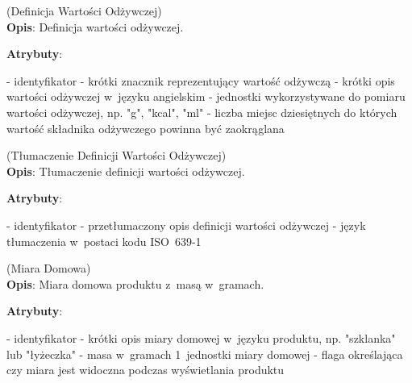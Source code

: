 \begin{enumerate}[label={\textbf{KAT/2/\protect\twodigits{\theenumi}}}, wide, labelwidth=!, labelindent=0pt, labelsep=0pt, series=reqs]
    \label{kat:NutritionDefinition} (Definicja Wartości Odżywczej)\\
    \indent\textbf{Opis}: Definicja wartości odżywczej.
    \par
    \textbf{Atrybuty}:
    \begin{itemize}[series=atr, wide, align=left, leftmargin=190pt]
        \label{kat:NutritionDefinition:id}- identyfikator
        \label{kat:NutritionDefinition:tag}- krótki znacznik reprezentujący wartość odżywczą
        \label{kat:NutritionDefinition:description}- krótki opis wartości odżywczej w~języku angielskim
        \label{kat:NutritionDefinition:units}- jednostki wykorzystywane do pomiaru wartości odżywczej, np. "g", "kcal", "ml"
        \label{kat:NutritionDefinition:decimalPlaces}- liczba miejsc dziesiętnych do których wartość składnika odżywczego powinna być zaokrąglana
    \end{itemize}

    \label{kat:NutritionDefinitionTranslation} (Tłumaczenie Definicji Wartości Odżywczej)\\
    \indent\textbf{Opis}: Tłumaczenie definicji wartości odżywczej.
    \par
    \textbf{Atrybuty}:
    \begin{itemize}[series=atr, wide, align=left, leftmargin=190pt]
        \label{kat:NutritionDefinitionTranslation:id}- identyfikator
        \label{kat:NutritionDefinitionTranslation:translation}- przetłumaczony opis definicji wartości odżywczej
        \label{kat:NutritionDefinitionTranslation:language}- język tłumaczenia w~postaci kodu ISO~639-1
    \end{itemize}

    \label{kat:HouseholdMeasure} (Miara Domowa)\\
    \indent\textbf{Opis}: Miara domowa produktu z~masą w~gramach.
    \par
    \textbf{Atrybuty}:
    \begin{itemize}[series=atr, wide, align=left, leftmargin=190pt]
        \label{kat:HouseholdMeasure:id}- identyfikator
        \label{kat:HouseholdMeasure:description}- krótki opis miary domowej w~języku produktu, np. "szklanka" lub "łyżeczka"
        \label{kat:HouseholdMeasure:gramsWeight}- masa w~gramach 1~jednostki miary domowej
        \label{kat:HouseholdMeasure:isVisible}- flaga określająca czy miara jest widoczna podczas wyświetlania produktu
    \end{itemize}


\end{enumerate}
